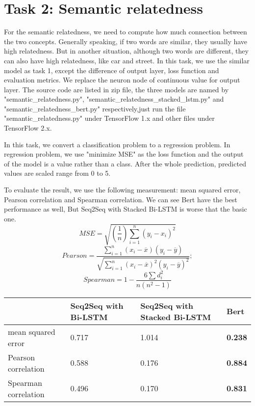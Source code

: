 \documentclass{article}
\begin{document}
\section{Task 2: Semantic relatedness}
For the semantic relatedness, we need to compute how much connection between the two concepts. Generally speaking, if two words are similar, they usually have high relatedness. But in another situation, although two words are different, they can also have high relatedness, like car and street. In this task, we use the similar model as task 1, except the difference of output layer, loss function and evaluation metrics. We replace the neuron node of continuous value for output layer. The source code are listed in zip file, the three models are named by "semantic\_relatedness.py", "semantic\_relatedness\_stacked\_lstm.py" and "semantic\_relatedness\_bert.py" respectively,just run the file "semantic\_relatedness.py" under TensorFlow 1.x and other files under TensorFlow 2.x.

In this task, we convert a classification problem to a regression problem. In regression problem, we use "minimize MSE" as the loss function and the output of the model is a value rather than a class. After the whole prediction, predicted values are scaled range from 0 to 5.

To evaluate the result, we use the following measurement: mean squared error, Pearson correlation and Spearman correlation. We can see Bert have the best performance as well, But Seq2Seq with Stacked Bi-LSTM is worse that the basic one.
\begin{equation}
MSE = \sqrt{(\frac{1}{n})\sum_{i=1}^{n}(y_{i} - x_{i})^{2}}
\end{equation}
\begin{equation}
Pearson = \frac{{}\sum_{i=1}^{n} (x_i - \overline{x})(y_i - \overline{y})}
{\sqrt{\sum_{i=1}^{n} (x_i - \overline{x})^2(y_i - \overline{y})^2}};
\end{equation}
\begin{equation}
Spearman = 1- {\frac {6 \sum d_i^2}{n(n^2 - 1)}}
\end{equation}

\begin{tabular}{ |p{4cm}||p{1.5cm}|p{2cm}|p{1.5cm}|  }
\hline
&Seq2Seq with Bi-LSTM & Seq2Seq with Stacked Bi-LSTM & Bert\\
\hline
mean squared error& 0.717 & 1.014 & \textbf{0.238} \\
Pearson correlation& 0.588 & 0.176 & \textbf{0.884}\\
Spearman correlation& 0.496 & 0.170 & \textbf{0.831}\\
\hline
\end{tabular}
\end{document}
